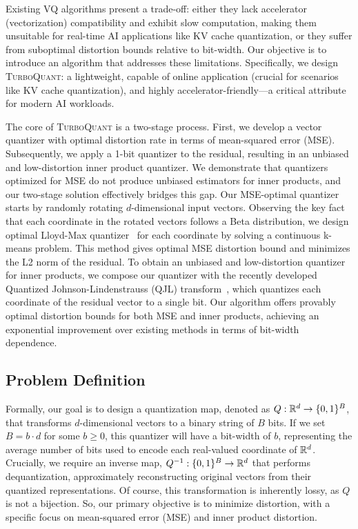 \documentclass[11pt]{article}
\newcommand{\TurboQuant}{\textsc{TurboQuant}\xspace}
\begin{document}
Existing VQ algorithms present a trade-off: either they lack accelerator (vectorization) compatibility and exhibit slow computation, making them unsuitable for real-time AI applications like KV cache quantization, or they suffer from suboptimal distortion bounds relative to bit-width.
Our objective is to introduce an algorithm that addresses these limitations.
Specifically, we design \TurboQuant: a lightweight, capable of online application (crucial for scenarios like KV cache quantization), and highly accelerator-friendly—a critical attribute for modern AI workloads. 

The core of \TurboQuant is a two-stage process. 
First, we develop a vector quantizer with optimal distortion rate in terms of mean-squared error (MSE). 
Subsequently, we apply a 1-bit quantizer to the residual, resulting in an unbiased and low-distortion inner product quantizer. 
We demonstrate that quantizers optimized for MSE do not produce unbiased estimators for inner products, and our two-stage solution effectively bridges this gap.
Our MSE-optimal quantizer starts by randomly rotating $d$-dimensional input vectors. 
Observing the key fact that each coordinate in the rotated vectors follows a Beta distribution, we design optimal Lloyd-Max quantizer~\cite{lloyd1982least, max1960quantizing} for each coordinate by solving a continuous k-means problem.
This method gives optimal MSE distortion bound and minimizes the L2 norm of the residual.
To obtain an unbiased and low-distortion quantizer for inner products, we compose our quantizer with the recently developed Quantized Johnson-Lindenstrauss (QJL) transform~\cite{qjl}, which quantizes each coordinate of the residual vector to a single bit.
Our algorithm offers provably optimal distortion bounds for both MSE and inner products, achieving an exponential improvement over existing methods in terms of bit-width dependence.


\subsection{Problem Definition}

Formally, our goal is to design a quantization map, denoted as $Q: \mathbb{R}^d \to \{ 0, 1 \}^B$, that transforms $d$-dimensional vectors to a binary string of $B$ bits.
If we set $B = b \cdot d$ for some $b \ge 0$, this quantizer will have a bit-width of $b$, representing the average number of bits used to encode each real-valued coordinate of $\mathbb{R}^d$.
Crucially, we require an inverse map, $Q^{-1}: \{ 0, 1 \}^B \to \mathbb{R}^d$ that performs dequantization, approximately reconstructing original vectors from their quantized representations.
Of course, this transformation is inherently lossy, as $Q$ is not a bijection. 
So, our primary objective is to minimize distortion, with a specific focus on mean-squared error (MSE) and inner product distortion. 
\end{document}
